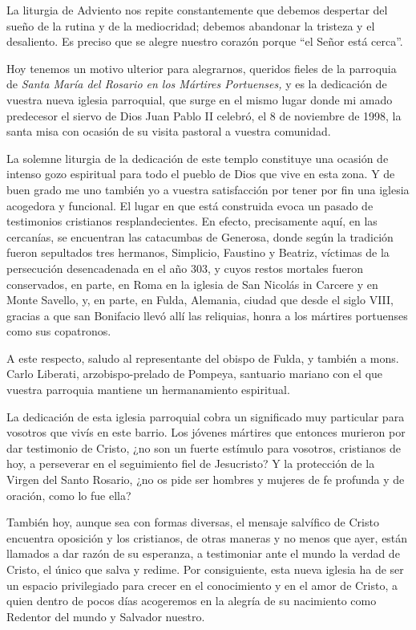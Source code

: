 La liturgia de Adviento nos repite constantemente que debemos despertar
del sueño de la rutina y de la mediocridad; debemos abandonar la
tristeza y el desaliento. Es preciso que se alegre nuestro corazón
porque ``el Señor está cerca''.

Hoy tenemos un motivo ulterior para alegrarnos, queridos fieles de la
parroquia de \emph{Santa María del Rosario en los Mártires Portuenses,}
y es la dedicación de vuestra nueva iglesia parroquial, que surge en el
mismo lugar donde mi amado predecesor el siervo de Dios Juan Pablo II
celebró, el 8 de noviembre de 1998, la santa misa con ocasión de su
visita pastoral a vuestra comunidad.

La solemne liturgia de la dedicación de este templo constituye una
ocasión de intenso gozo espiritual para todo el pueblo de Dios que vive
en esta zona. Y de buen grado me uno también yo a vuestra satisfacción
por tener por fin una iglesia acogedora y funcional. El lugar en que
está construida evoca un pasado de testimonios cristianos
resplandecientes. En efecto, precisamente aquí, en las cercanías, se
encuentran las catacumbas de Generosa, donde según la tradición fueron
sepultados tres hermanos, Simplicio, Faustino y Beatriz, víctimas de la
persecución desencadenada en el año 303, y cuyos restos mortales fueron
conservados, en parte, en Roma en la iglesia de San Nicolás in Carcere y
en Monte Savello, y, en parte, en Fulda, Alemania, ciudad que desde el
siglo VIII, gracias a que san Bonifacio llevó allí las reliquias, honra
a los mártires portuenses como sus copatronos.

A este respecto, saludo al representante del obispo de Fulda, y también
a mons. Carlo Liberati, arzobispo-prelado de Pompeya, santuario mariano
con el que vuestra parroquia mantiene un hermanamiento espiritual.

La dedicación de esta iglesia parroquial cobra un significado muy
particular para vosotros que vivís en este barrio. Los jóvenes mártires
que entonces murieron por dar testimonio de Cristo, ¿no son un fuerte
estímulo para vosotros, cristianos de hoy, a perseverar en el
seguimiento fiel de Jesucristo? Y la protección de la Virgen del Santo
Rosario, ¿no os pide ser hombres y mujeres de fe profunda y de oración,
como lo fue ella?

También hoy, aunque sea con formas diversas, el mensaje salvífico de
Cristo encuentra oposición y los cristianos, de otras maneras y no menos
que ayer, están llamados a dar razón de su esperanza, a testimoniar ante
el mundo la verdad de Cristo, el único que salva y redime. Por
consiguiente, esta nueva iglesia ha de ser un espacio privilegiado para
crecer en el conocimiento y en el amor de Cristo, a quien dentro de
pocos días acogeremos en la alegría de su nacimiento como Redentor del
mundo y Salvador nuestro.

